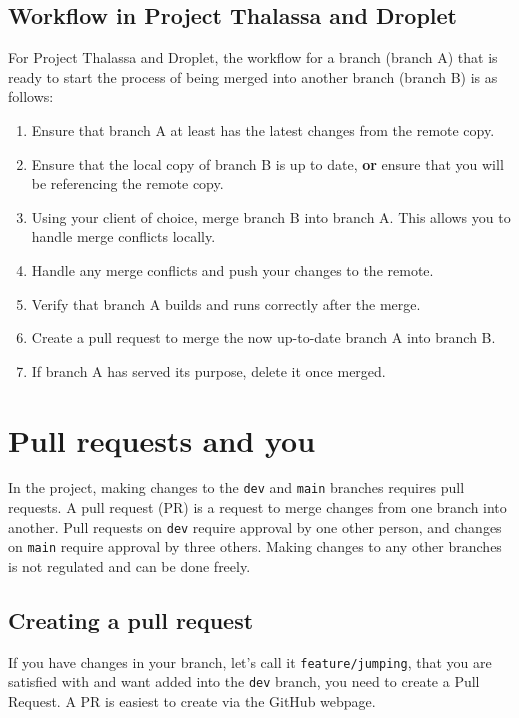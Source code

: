 \documentclass[12pt,a4paper]{article}
\begin{document}
    \subsection{Workflow in Project Thalassa and Droplet}
    \label{subsec:workflow}
        For Project Thalassa and Droplet, the workflow for a branch (branch A) that is ready to start the process of being merged into another branch (branch B) is as follows:
        \begin{enumerate}
            \item Ensure that branch A at least has the latest changes from the remote copy.
            \item Ensure that the local copy of branch B is up to date, \textbf{or} ensure that you will be referencing the remote copy.
            \item Using your client of choice, merge branch B into branch A. This allows you to handle merge conflicts locally.
            \item Handle any merge conflicts and push your changes to the remote.
            \item Verify that branch A builds and runs correctly after the merge.
            \item Create a pull request to merge the now up-to-date branch A into branch B.
            \item If branch A has served its purpose, delete it once merged.
        \end{enumerate}
    
\section{Pull requests and you}
\label{sec:pr}
    In the project, making changes to the \verb|dev| and \verb|main| branches requires pull requests. A pull request (PR) is a request to merge changes from one branch into another. Pull requests on \verb|dev| require approval by one other person, and changes on \verb|main| require approval by three others. Making changes to any other branches is not regulated and can be done freely.

    \subsection{Creating a pull request}
        If you have changes in your branch, let's call it \verb|feature/jumping|, that you are satisfied with and want added into the \verb|dev| branch, you need to create a Pull Request. A PR is easiest to create via the GitHub webpage.
    
\end{document}
